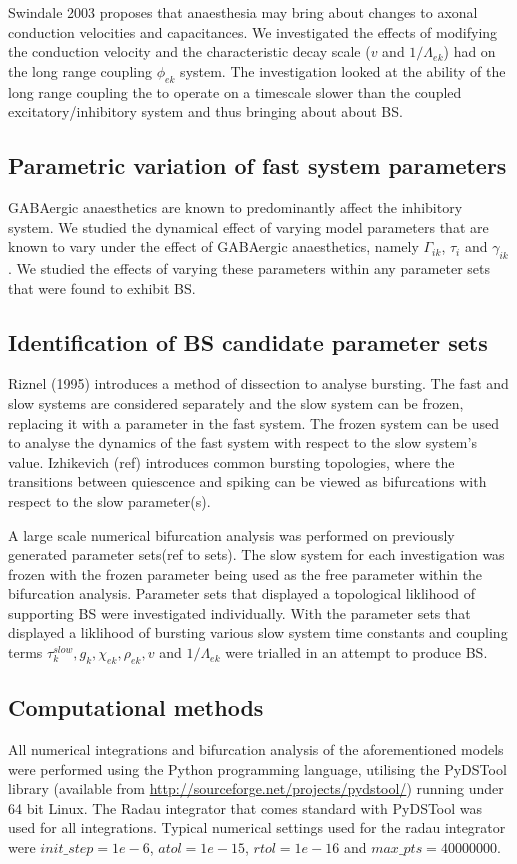 \documentclass[a4paper,12pt]{article}
\begin{document}
Swindale 2003 proposes that anaesthesia may bring about changes to axonal conduction velocities and capacitances. We investigated the
effects of modifying the conduction velocity and the characteristic decay scale ($v$ and $1 / \Lambda_{ek}$) had on the
long range coupling $\phi_{ek}$ system. The investigation looked at the ability of the long range coupling the to operate on a timescale slower than the coupled excitatory/inhibitory system and thus bringing about about BS.

\subsection{Parametric variation of fast system parameters}
GABAergic anaesthetics are known to predominantly affect the inhibitory system. We studied the dynamical effect of varying model parameters that are known to vary under the effect of GABAergic anaesthetics, namely $\Gamma_{ik}$, $\tau_i$ and $\gamma_{ik}$. We studied the effects of varying these parameters within any parameter sets that were found to exhibit BS.

\subsection{Identification of BS candidate parameter sets}
Riznel (1995) introduces a method of dissection to analyse bursting. The fast and slow systems are considered separately and the slow system can be frozen, replacing it with a parameter in the fast system. The frozen system can be used to analyse the dynamics of the fast system with respect to the slow system's value. Izhikevich (ref) introduces common bursting topologies, where the transitions between quiescence and spiking can be viewed as bifurcations with respect to the slow parameter(s).

A large scale numerical bifurcation analysis was performed on previously generated parameter sets(ref to sets). The slow system for each investigation was frozen with the frozen parameter being used as the free parameter within the bifurcation analysis. Parameter sets that displayed a topological liklihood of supporting BS were investigated individually. With the parameter sets that displayed a liklihood of bursting various slow system time constants and coupling terms $\tau_k^{slow}, g_k, \chi_{ek}, \rho_{ek}, v$ and $1 / \Lambda_{ek}$ were trialled in an attempt to produce BS.

\subsection{Computational methods}
All numerical integrations and bifurcation analysis of the aforementioned models were performed using the Python programming language, utilising
the PyDSTool library (available from \url{http://sourceforge.net/projects/pydstool/}) running under 64 bit
Linux. The Radau integrator that comes standard with PyDSTool was used for all integrations.
Typical numerical settings used for the radau integrator were $init\_step = 1e-6$, $atol = 1e-15$, $rtol = 1e-16$ and
$max\_pts = 40000000$.
\end{document}
